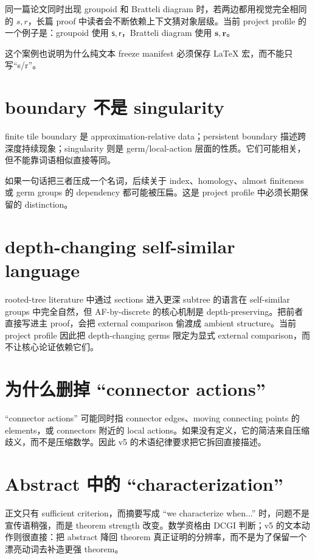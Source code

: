 \documentclass[UTF8,fontset=none,12pt,openany]{ctexbook}
\begin{document}
同一篇论文同时出现 groupoid 和 Bratteli diagram 时，若两边都用视觉完全相同的 $s,r$，长篇 proof 中读者会不断依赖上下文猜对象层级。当前 project profile 的一个例子是：groupoid 使用 $\mathsf{s},\mathsf{r}$，Bratteli diagram 使用 $\mathbf{s},\mathbf{r}$。

这个案例也说明为什么纯文本 freeze manifest 必须保存 LaTeX 宏，而不能只写“s/r”。

\section{boundary 不是 singularity}

finite tile boundary 是 approximation-relative data；persistent boundary 描述跨深度持续现象；singularity 则是 germ/local-action 层面的性质。它们可能相关，但不能靠词语相似直接等同。

如果一句话把三者压成一个名词，后续关于 index、homology、almost finiteness 或 germ groups 的 dependency 都可能被压扁。这是 project profile 中必须长期保留的 distinction。

\section{depth-changing self-similar language}

rooted-tree literature 中通过 sections 进入更深 subtree 的语言在 self-similar groups 中完全自然，但 AF-by-discrete 的核心机制是 depth-preserving。把前者直接写进主 proof，会把 external comparison 偷渡成 ambient structure。当前 project profile 因此把 depth-changing germs 限定为显式 external comparison，而不让核心论证依赖它们。

\section{为什么删掉 “connector actions”}

“connector actions” 可能同时指 connector edges、moving connecting points 的 elements，或 connectors 附近的 local actions。如果没有定义，它的简洁来自压缩歧义，而不是压缩数学。因此 v5 的术语纪律要求把它拆回直接描述。

\section{Abstract 中的 “characterization”}

正文只有 sufficient criterion，而摘要写成 “we characterize when...” 时，问题不是宣传语稍强，而是 theorem strength 改变。数学资格由 DCGI 判断；v5 的文本动作则很直接：把 abstract 降回 theorem 真正证明的分辨率，而不是为了保留一个漂亮动词去补造更强 theorem。
\end{document}
